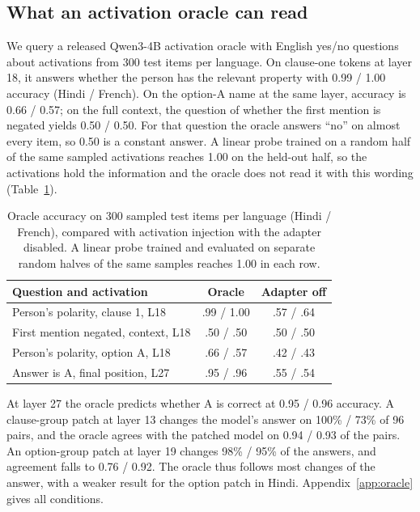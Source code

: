 \documentclass[11pt]{article}
\begin{document}
\subsection{What an activation oracle can read}
\label{sec:oracle}
We query a released Qwen3-4B activation oracle \citep{karvonen2026oracles} with English yes/no questions about activations from 300 test items per language. On clause-one tokens at layer 18, it answers whether the person has the relevant property with 0.99 / 1.00 accuracy (Hindi / French). On the option-A name at the same layer, accuracy is 0.66 / 0.57; on the full context, the question of whether the first mention is negated yields 0.50 / 0.50. For that question the oracle answers ``no'' on almost every item, so 0.50 is a constant answer. A linear probe trained on a random half of the same sampled activations reaches 1.00 on the held-out half, so the activations hold the information and the oracle does not read it with this wording (Table~\ref{tab:oracle}).

\begin{table}[t]
\small\centering
\begin{tabularx}{\linewidth}{@{}Xcc@{}}
\toprule
Question and activation & Oracle & Adapter off \\
\midrule
Person's polarity, clause 1, L18 & .99 / 1.00 & .57 / .64 \\
First mention negated, context, L18 & .50 / .50 & .50 / .50 \\
Person's polarity, option A, L18 & .66 / .57 & .42 / .43 \\
Answer is A, final position, L27 & .95 / .96 & .55 / .54 \\
\bottomrule
\end{tabularx}
\caption{Oracle accuracy on 300 sampled test items per language (Hindi / French), compared with activation injection with the adapter disabled. A linear probe trained and evaluated on separate random halves of the same samples reaches 1.00 in each row.}
\label{tab:oracle}
\end{table}

At layer 27 the oracle predicts whether A is correct at 0.95 / 0.96 accuracy. A clause-group patch at layer 13 changes the model's answer on 100\% / 73\% of 96 pairs, and the oracle agrees with the patched model on 0.94 / 0.93 of the pairs. An option-group patch at layer 19 changes 98\% / 95\% of the answers, and agreement falls to 0.76 / 0.92. The oracle thus follows most changes of the answer, with a weaker result for the option patch in Hindi. Appendix~\ref{app:oracle} gives all conditions.
\end{document}
